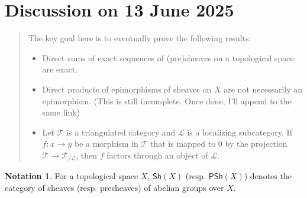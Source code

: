 \documentclass[oneside,11pt]{amsart}
\theoremstyle{definition}
\newtheorem{notn}[thm]{Notation}
\theoremstyle{remark}
\begin{document}
\section*{Discussion on 13 June 2025} 
\begin{quotation}
 The key goal here is to eventually prove the following results:
 \begin{itemize}
  \item Direct sums of exact sequences of (pre)sheaves on a topological space are exact.
 \item Direct products of epimorphisms of sheaves on $X$ are not necessarily an epimorphism. (This is still incomplete. Once done, I'll append to the same link)
 \item Let $\mathscr{T} $ is a triangulated category and $\mathscr{L} $ is a localizing subcategory. If $f:x\rightarrow y$ be a morphism in $\mathscr{T} $ that is mapped to $0$ by the projection $\mathscr{T} \rightarrow \mathscr{T}_{/\mathscr{L}}   $, then $f$ factors through an object of $\mathscr{L} $.  
 \end{itemize}
\end{quotation}
\begin{notn}
For a topological space $X$, $\textsf{Sh}(X)$ (resp. $\textsf{PSh}(X)$) denotes the category of sheaves (resp. presheaves) of abelian groups over $X$.      
\end{notn}
\end{document}
